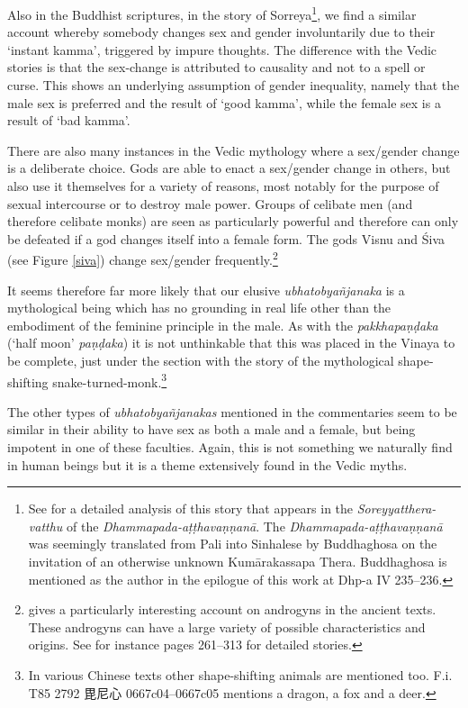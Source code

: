 Also in the Buddhist scriptures, in the story of Sorreya\footnote{See \cite{dhammadinna} for a detailed analysis of this story that appears in the {\em Soreyyatthera-vatthu} of the {\em Dhammapada-aṭṭhavaṇṇanā}. The {\em Dhammapada-aṭṭhavaṇṇanā} was seemingly translated from Pali into Sinhalese by Buddhaghosa on the invitation of an otherwise unknown Kumārakassapa Thera. Buddhaghosa is mentioned as the author in the epilogue of this work at Dhp-a IV 235–236.}, we find a similar account whereby somebody changes sex and gender involuntarily due to their `instant kamma’, triggered by impure thoughts. The difference with the Vedic stories is that the sex-change is attributed to causality and not to a spell or curse. This shows an underlying assumption of gender inequality, namely that the male sex is preferred and the result of `good kamma', while the female sex is a result of `bad kamma'.

There are also many instances in the Vedic mythology where a sex/gender change is a deliberate choice. Gods are able to enact a sex/gender change in others, but also use it themselves for a variety of reasons, most notably for the purpose of sexual intercourse or to destroy male power. Groups of celibate men (and therefore celibate monks) are seen as particularly powerful and therefore can only be defeated if a god changes itself into a female form. The gods Visnu and Śiva (see Figure \ref{siva}) change sex/gender frequently.\footnote{\cite{wendy} gives a particularly interesting account on androgyns in the ancient texts. These androgyns can have a large variety of possible characteristics and origins. See for instance pages 261–313 for detailed stories.}

It seems therefore far more likely that our elusive {\em ubhatob­yañ­janaka} is a mythological being which has no grounding in real life other than the embodiment of the feminine principle in the male. As with the {\em pakkhapaṇḍaka} (`half moon' {\em paṇḍaka}) it is not unthinkable that this was placed in the Vinaya to be complete, just under the section with the story of the mythological shape-shifting snake-turned-monk.\footnote{In various Chinese texts other shape-shifting animals are mentioned too. F.i. T85 2792 毘尼心 0667c04–0667c05 mentions a dragon, a fox and a deer.}

The other types of {\em ubhatob­yañ­janakas} mentioned in the commentaries seem to be similar in their ability to have sex as both a male and a female, but being impotent in one of these faculties. Again, this is not something we naturally find in human beings but it is a theme extensively found in the Vedic myths.

